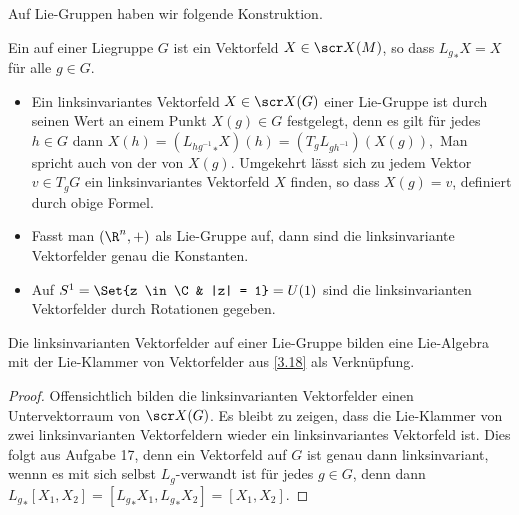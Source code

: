 
Auf Lie-Gruppen haben wir folgende Konstruktion.

\begin{df} \label{4.5}
    Ein  auf einer Liegruppe $G$ ist ein Vektorfeld $X \in \scr X(M)$, so dass
    \begin{math}
        {L_g}_* X = X
    \end{math}
    für alle $g \in G$.
    \begin{note}
        \begin{itemize}
            \item
                Ein linksinvariantes Vektorfeld $X \in \scr X(G)$ einer Lie-Gruppe ist durch seinen Wert an einem Punkt $X(g) \in G$ festgelegt, denn es gilt für jedes $h \in G$ dann
                \begin{math}
                    X(h) = ({L_{hg^{-1}}}_* X)(h)
                    = (T_{g} L_{gh^{-1}})(X(g)),
                \end{math}
                Man spricht auch von der  von $X(g)$.
                Umgekehrt lässt sich zu jedem Vektor $v \in T_g G$ ein linksinvariantes Vektorfeld $X$ finden, so dass $X(g) = v$, definiert durch obige Formel.
        \end{itemize}
    \end{note}
\end{df}

\begin{ex*}
    \begin{itemize}
        \item
            Fasst man $(\R^n, +)$ als Lie-Gruppe auf, dann sind die linksinvariante Vektorfelder genau die Konstanten.
        \item
            Auf $S^1 = \Set{z \in \C & |z| = 1} = U(1)$ sind die linksinvarianten Vektorfelder durch Rotationen gegeben.
    \end{itemize}
\end{ex*}

\begin{lem} \label{4.6}
    Die linksinvarianten Vektorfelder auf einer Lie-Gruppe bilden eine Lie-Algebra mit der Lie-Klammer von Vektorfelder aus \ref{3.18} als Verknüpfung.
    \begin{proof}
        Offensichtlich bilden die linksinvarianten Vektorfelder einen Untervektorraum von $\scr X(G)$.
        Es bleibt zu zeigen, dass die Lie-Klammer von zwei linksinvarianten Vektorfeldern wieder ein linksinvariantes Vektorfeld ist.
        Dies folgt aus Aufgabe 17, denn ein Vektorfeld auf $G$ ist genau dann linksinvariant, wennn es mit sich selbst $L_g$-verwandt ist für jedes $g \in G$, denn dann
        \begin{math}
            {L_{g}}_* [X_1, X_2]
            = [{L_g}_* X_1, {L_g}_* X_2]
            = [X_1, X_2].
        \end{math}
    \end{proof}
\end{lem}

